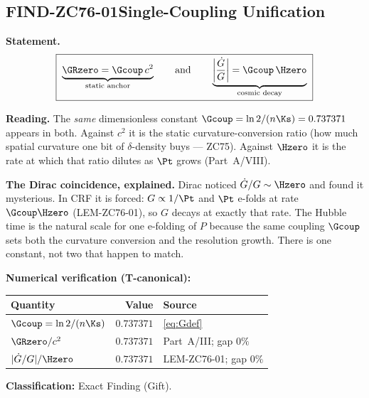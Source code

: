 \documentclass[12pt, a4paper]{article}
\begin{document}
\subsection{FIND-ZC76-01\quad Single-Coupling Unification}
\label{sec:find01}


\begin{giftbox}[title={FIND-ZC76-01: One $\mathcal{G}$, Two Faces of
  Gravity ($R_0$ + cosmological, Exact)}]

\textbf{Statement.}
\begin{equation}
  \boxed{\;
    \underbrace{\GRzero = \Gcoup\,c^2}_{\text{static anchor}}
    \qquad\text{and}\qquad
    \underbrace{\left|\frac{\dot{G}}{G}\right| = \Gcoup\,\Hzero}
      _{\text{cosmic decay}}
  \;}
  \label{eq:unification}
\end{equation}

\textbf{Reading.}
The \emph{same} dimensionless constant $\Gcoup = \ln2/(n\Ks) =
0.737371$ appears in both. Against $c^2$ it is the static
curvature-conversion ratio (how much spatial curvature one bit of
$\delta$-density buys --- ZC75). Against $\Hzero$ it is the rate at
which that ratio dilutes as $\Pt$ grows (Part~A/VIII).

\textbf{The Dirac coincidence, explained.}
Dirac noticed $\dot{G}/G \sim \Hzero$ and found it mysterious. In CRF it
is forced: $G\propto 1/\Pt$ and $\Pt$ e-folds at rate $\Gcoup\Hzero$
(LEM-ZC76-01), so $G$ decays at exactly that rate. The Hubble time is
the natural scale for one e-folding of $P$ because the same coupling
$\Gcoup$ sets both the curvature conversion and the resolution growth.
There is one constant, not two that happen to match.

\textbf{Numerical verification (T-canonical):}
\begin{center}
{\small\renewcommand{\arraystretch}{1.25}
\begin{tabular}{@{}lrl@{}}
\toprule
Quantity & Value & Source \\
\midrule
$\Gcoup = \ln2/(n\Ks)$       & $0.737371$ & \eqref{eq:Gdef} \\
$\GRzero/c^2$                & $0.737371$ & Part~A/III; gap $0\%$ \\
$|\dot{G}/G|/\Hzero$         & $0.737371$ & LEM-ZC76-01; gap $0\%$ \\
\bottomrule
\end{tabular}}
\end{center}

\textbf{Classification:} Exact Finding (Gift).
\end{giftbox}
\end{document}
